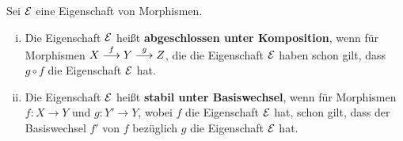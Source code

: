 \begin{defn}
\label{defn:8.10}
	Sei $\mathcal{E}$ eine Eigenschaft von Morphismen.
	\begin{enumerate}[i)]
		\item Die Eigenschaft $\mathcal{E}$ heißt \textbf{abgeschlossen unter Komposition}, wenn für Morphismen $X \overset{f}{\longrightarrow} Y \overset{g}{\longrightarrow}Z$, die die Eigenschaft $\mathcal{E}$ haben schon gilt, dass $g \circ f$ die Eigenschaft $\mathcal{E}$ hat.
		\item Die Eigenschaft $\mathcal{E}$ heißt \textbf{stabil unter Basiswechsel}, wenn für Morphismen $f\colon X \to Y$ und $g \colon Y' \to Y$, wobei $f$ die Eigenschaft $\mathcal{E}$ hat, schon gilt, dass der Basiswechsel $f'$ von $f$ bezüglich $g$ die Eigenschaft $\mathcal{E}$ hat.
	\end{enumerate}
\end{defn}

